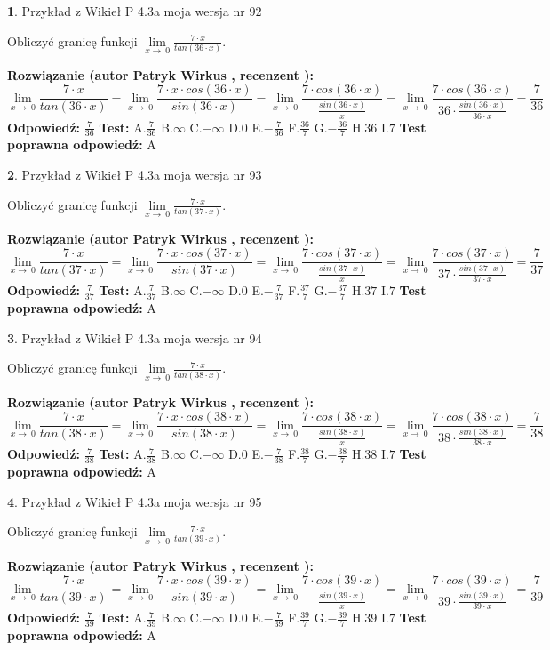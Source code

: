 \documentclass[12pt, a4paper]{article}
\theoremstyle{definition} %
\newtheorem{zad}{}
\newcommand{\zadStart}[1]{\begin{zad}#1\newline}
\newcommand{\zadStop}{\end{zad}}
\newcommand{\rozwStart}[2]{\noindent \textbf{Rozwiązanie (autor #1 , recenzent #2): }\newline}
\newcommand{\rozwStop}{\newline}
\newcommand{\odpStart}{\noindent \textbf{Odpowiedź:}\newline}
\newcommand{\odpStop}{\newline}
\newcommand{\testStart}{\noindent \textbf{Test:}\newline}
\newcommand{\testStop}{\newline}
\newcommand{\kluczStart}{\noindent \textbf{Test poprawna odpowiedź:}\newline}
\newcommand{\kluczStop}{\newline}
\begin{document}
\zadStart{Przykład z Wikieł P 4.3a moja wersja nr 92}


Obliczyć granicę funkcji $\lim\limits_{x\to\ 0}\frac{7 \cdot x}{tan(36 \cdot x)}$.
\zadStop
\rozwStart{Patryk Wirkus}{}
$$\lim\limits_{x\to\ 0}\frac{7 \cdot x}{tan(36 \cdot x)}=\lim\limits_{x\to\ 0}\frac{7 \cdot x \cdot cos(36 \cdot x)}{sin(36 \cdot x)}=\lim\limits_{x\to\ 0}\frac{7 \cdot cos(36 \cdot x)}{\frac{sin(36 \cdot x)}{x}}=\lim\limits_{x\to\ 0}\frac{7 \cdot cos(36 \cdot x)}{36 \cdot \frac{sin(36 \cdot x)}{36 \cdot x}} = \frac{7}{36}$$
\rozwStop
\odpStart
$\frac{7}{36}$
\odpStop
\testStart
A.$\frac{7}{36}$
B.$\infty$
C.$-\infty$
D.$0$
E.$-\frac{7}{36}$
F.$\frac{36}{7}$
G.$-\frac{36}{7}$
H.$36$
I.$7$
\testStop
\kluczStart
A
\kluczStop



\zadStart{Przykład z Wikieł P 4.3a moja wersja nr 93}


Obliczyć granicę funkcji $\lim\limits_{x\to\ 0}\frac{7 \cdot x}{tan(37 \cdot x)}$.
\zadStop
\rozwStart{Patryk Wirkus}{}
$$\lim\limits_{x\to\ 0}\frac{7 \cdot x}{tan(37 \cdot x)}=\lim\limits_{x\to\ 0}\frac{7 \cdot x \cdot cos(37 \cdot x)}{sin(37 \cdot x)}=\lim\limits_{x\to\ 0}\frac{7 \cdot cos(37 \cdot x)}{\frac{sin(37 \cdot x)}{x}}=\lim\limits_{x\to\ 0}\frac{7 \cdot cos(37 \cdot x)}{37 \cdot \frac{sin(37 \cdot x)}{37 \cdot x}} = \frac{7}{37}$$
\rozwStop
\odpStart
$\frac{7}{37}$
\odpStop
\testStart
A.$\frac{7}{37}$
B.$\infty$
C.$-\infty$
D.$0$
E.$-\frac{7}{37}$
F.$\frac{37}{7}$
G.$-\frac{37}{7}$
H.$37$
I.$7$
\testStop
\kluczStart
A
\kluczStop



\zadStart{Przykład z Wikieł P 4.3a moja wersja nr 94}


Obliczyć granicę funkcji $\lim\limits_{x\to\ 0}\frac{7 \cdot x}{tan(38 \cdot x)}$.
\zadStop
\rozwStart{Patryk Wirkus}{}
$$\lim\limits_{x\to\ 0}\frac{7 \cdot x}{tan(38 \cdot x)}=\lim\limits_{x\to\ 0}\frac{7 \cdot x \cdot cos(38 \cdot x)}{sin(38 \cdot x)}=\lim\limits_{x\to\ 0}\frac{7 \cdot cos(38 \cdot x)}{\frac{sin(38 \cdot x)}{x}}=\lim\limits_{x\to\ 0}\frac{7 \cdot cos(38 \cdot x)}{38 \cdot \frac{sin(38 \cdot x)}{38 \cdot x}} = \frac{7}{38}$$
\rozwStop
\odpStart
$\frac{7}{38}$
\odpStop
\testStart
A.$\frac{7}{38}$
B.$\infty$
C.$-\infty$
D.$0$
E.$-\frac{7}{38}$
F.$\frac{38}{7}$
G.$-\frac{38}{7}$
H.$38$
I.$7$
\testStop
\kluczStart
A
\kluczStop



\zadStart{Przykład z Wikieł P 4.3a moja wersja nr 95}


Obliczyć granicę funkcji $\lim\limits_{x\to\ 0}\frac{7 \cdot x}{tan(39 \cdot x)}$.
\zadStop
\rozwStart{Patryk Wirkus}{}
$$\lim\limits_{x\to\ 0}\frac{7 \cdot x}{tan(39 \cdot x)}=\lim\limits_{x\to\ 0}\frac{7 \cdot x \cdot cos(39 \cdot x)}{sin(39 \cdot x)}=\lim\limits_{x\to\ 0}\frac{7 \cdot cos(39 \cdot x)}{\frac{sin(39 \cdot x)}{x}}=\lim\limits_{x\to\ 0}\frac{7 \cdot cos(39 \cdot x)}{39 \cdot \frac{sin(39 \cdot x)}{39 \cdot x}} = \frac{7}{39}$$
\rozwStop
\odpStart
$\frac{7}{39}$
\odpStop
\testStart
A.$\frac{7}{39}$
B.$\infty$
C.$-\infty$
D.$0$
E.$-\frac{7}{39}$
F.$\frac{39}{7}$
G.$-\frac{39}{7}$
H.$39$
I.$7$
\testStop
\kluczStart
A
\kluczStop
\end{document}
